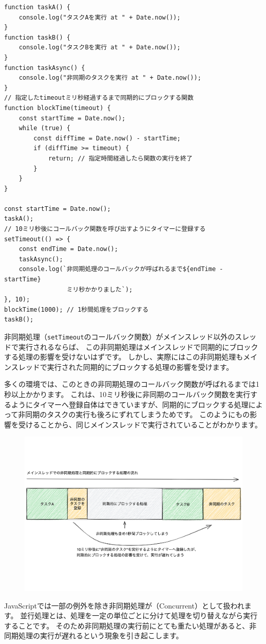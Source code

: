 \begin{lstlisting}
function taskA() {
    console.log("タスクAを実行 at " + Date.now());
}
function taskB() {
    console.log("タスクBを実行 at " + Date.now());
}
function taskAsync() {
    console.log("非同期のタスクを実行 at " + Date.now());
}
// 指定したtimeoutミリ秒経過するまで同期的にブロックする関数
function blockTime(timeout) { 
    const startTime = Date.now();
    while (true) {
        const diffTime = Date.now() - startTime;
        if (diffTime >= timeout) {
            return; // 指定時間経過したら関数の実行を終了
        }
    }
}

const startTime = Date.now();
taskA();
// 10ミリ秒後にコールバック関数を呼び出すようにタイマーに登録する
setTimeout(() => {
    const endTime = Date.now();
    taskAsync();
    console.log(`非同期処理のコールバックが呼ばれるまで${endTime - startTime}
                 ミリ秒かかりました`);
}, 10);
blockTime(1000); // 1秒間処理をブロックする
taskB();
\end{lstlisting}

非同期処理（\texttt{setTimeout}のコールバック関数）がメインスレッド以外のスレッドで実行されるならば、
この非同期処理はメインスレッドで同期的にブロックする処理の影響を受けないはずです。
しかし、実際にはこの非同期処理もメインスレッドで実行された同期的にブロックする処理の影響を受けます。

多くの環境では、このときの非同期処理のコールバック関数が呼ばれるまでは1秒以上かかります。
これは、10ミリ秒後に非同期のコールバック関数を実行するようにタイマーへ登録自体はできていますが、同期的にブロックする処理によって非同期のタスクの実行も後ろにずれてしまうためです。
このように\textbf{}も\textbf{}の影響を受けることから、同じメインスレッドで実行されていることがわかります。
\vspace{-10mm}
\begin{figure}[h]
\centering
\includegraphics[width=140mm]{fig/block-async-single-thread-tasks.pdf}
\end{figure}
\vspace{-10mm}
JavaScriptでは一部の例外を除き非同期処理が\textbf{}（Concurrent）として扱われます。
並行処理とは、処理を一定の単位ごとに分けて処理を切り替えながら実行することです。
そのため非同期処理の実行前にとても重たい処理があると、非同期処理の実行が遅れるという現象を引き起こします。

